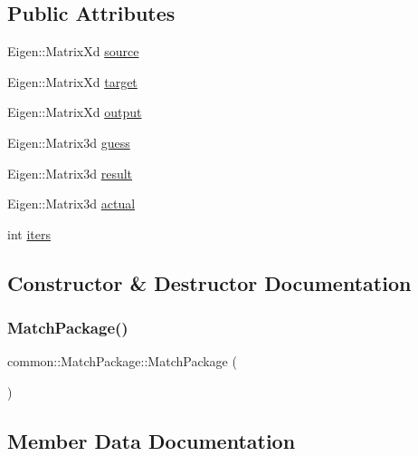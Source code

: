\subsection*{Public Attributes}
\begin{DoxyCompactItemize}
\item 
Eigen\+::\+Matrix\+Xd \hyperlink{structcommon_1_1MatchPackage_a1eafbc6a1740dde4ab7adf0e55728880}{source}
\item 
Eigen\+::\+Matrix\+Xd \hyperlink{structcommon_1_1MatchPackage_a99634972d12f9a982c16c0adc1fe18b2}{target}
\item 
Eigen\+::\+Matrix\+Xd \hyperlink{structcommon_1_1MatchPackage_ac54fe69fc83e64abaefe2c5eb07454d9}{output}
\item 
Eigen\+::\+Matrix3d \hyperlink{structcommon_1_1MatchPackage_a80b1337381b200114c7474979f3779b3}{guess}
\item 
Eigen\+::\+Matrix3d \hyperlink{structcommon_1_1MatchPackage_a320b399233744fff15114995ce555898}{result}
\item 
Eigen\+::\+Matrix3d \hyperlink{structcommon_1_1MatchPackage_a28fa25a397c65139fdfffb19394fffbd}{actual}
\item 
int \hyperlink{structcommon_1_1MatchPackage_a4c44c43d7f9ce0667d925d618d4940f4}{iters}
\end{DoxyCompactItemize}


\subsection{Constructor \& Destructor Documentation}
\mbox{\label{structcommon_1_1MatchPackage_affa0c8dc025d07ec5fd849ec8ef52aca}} 
\subsubsection{\texorpdfstring{Match\+Package()}{MatchPackage()}}
{\footnotesize\ttfamily common\+::\+Match\+Package\+::\+Match\+Package (\begin{DoxyParamCaption}{ }\end{DoxyParamCaption})\hspace{0.3cm}{\ttfamily [inline]}}



\subsection{Member Data Documentation}
\mbox{\label{structcommon_1_1MatchPackage_a28fa25a397c65139fdfffb19394fffbd}} 
